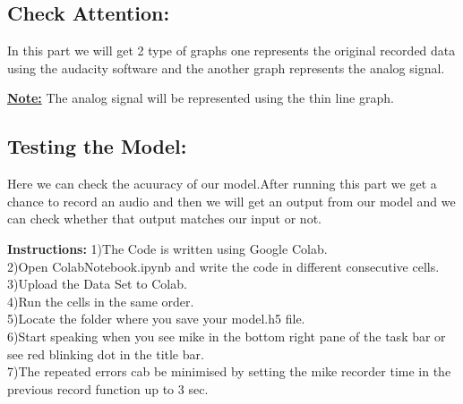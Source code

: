\documentclass[a4paper,12pt]{article}
\begin{document}
	
	\subsection{Check Attention:}In this part we will get 2 type of graphs one represents the original recorded  data using the audacity software and the another graph represents the analog signal.
	
	\textbf{\underline{Note:}} The analog signal will be represented using the thin line graph.
	
	
	
	\subsection{Testing the Model:} Here we can check the acuuracy of our model.After running this part we get a chance to record an audio and then we will get an output from our model and we can check whether that output matches our input or not.\\
	
	
	
	
	
	
	
	
	
	
	
	
	
	
	
	
	
	
	
	
	
	
	
	\newpage

\textbf{Instructions:}	
1)The Code is written using Google Colab.\\

2)Open ColabNotebook.ipynb and write the code in different consecutive cells.\\

3)Upload the Data Set to Colab.\\

4)Run the cells in the same order.\\

5)Locate the folder where you save your model.h5 file.\\

6)Start speaking when you see mike in the bottom right pane of the task bar or see red blinking dot in the title bar.\\

7)The repeated errors cab be minimised by setting the mike recorder time in the previous record function up to 3 sec.\\
	
\end{document}
